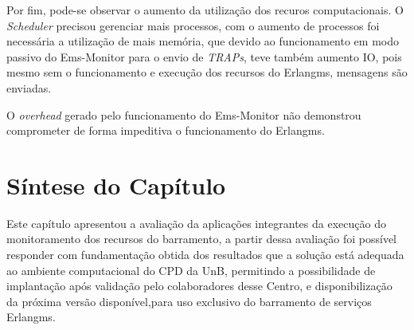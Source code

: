Por fim, pode-se observar o aumento da utilização dos recuros computacionais. O \textit{Scheduler} precisou gerenciar mais processos, com o aumento de processos foi necessária a utilização de mais memória, que devido ao funcionamento em modo passivo do Ems-Monitor para o envio de \textit{TRAPs}, teve também aumento IO, pois mesmo sem o funcionamento e execução dos recursos do Erlangms, mensagens são enviadas. 

O \textit{overhead} gerado pelo funcionamento do Ems-Monitor não demonstrou comprometer de forma impeditiva o funcionamento do Erlangms.    
 

\section{Síntese do Capítulo}
\label{sintese5}

Este capítulo apresentou a avaliação da aplicações integrantes da execução do monitoramento dos recursos do barramento, a partir dessa avaliação foi possível responder com fundamentação obtida dos resultados que a solução está adequada ao ambiente computacional do \acrshort{CPD} da \acrshort{UnB}, permitindo a possibilidade de implantação após validação pelo colaboradores desse Centro, e disponibilização da próxima versão disponível,para uso exclusivo do barramento de serviços Erlangms.